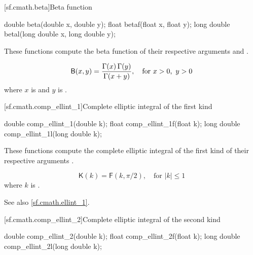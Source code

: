 [sf.cmath.beta]{Beta function}%
%
%
%
%
%
\begin{itemdecl}
double       beta(double x, double y);
float        betaf(float x, float y);
long double  betal(long double x, long double y);
\end{itemdecl}

\begin{itemdescr}

\pnum\effects
These functions compute
the beta function
of their respective arguments
 and .

\pnum\returns
\[%
  \mathsf{B}(x, y) =
  \frac{ \Gamma(x) \, \Gamma(y) }
       { \Gamma(x+y) },
       \quad \mbox{for $x > 0$,\, $y > 0$}
\]
where
$x$ is  and
$y$ is .
\end{itemdescr}

[sf.cmath.comp_ellint_1]{Complete elliptic integral of the first kind}%
%
%
%
%
%
\begin{itemdecl}
double       comp_ellint_1(double k);
float        comp_ellint_1f(float k);
long double  comp_ellint_1l(long double k);
\end{itemdecl}

\begin{itemdescr}
\pnum\effects
These functions compute
the complete elliptic integral of the first kind
of their respective arguments
.

\pnum\returns
\[%
  \mathsf{K}(k) =
  \mathsf{F}(k, \pi / 2),
		      \quad \mbox{for $|k| \le 1$}
\]
where
$k$ is .

\pnum See also \ref{sf.cmath.ellint_1}.
\end{itemdescr}

[sf.cmath.comp_ellint_2]{Complete elliptic integral of the second kind}%
%
%
%
%
%
\begin{itemdecl}
double       comp_ellint_2(double k);
float        comp_ellint_2f(float k);
long double  comp_ellint_2l(long double k);
\end{itemdecl}

